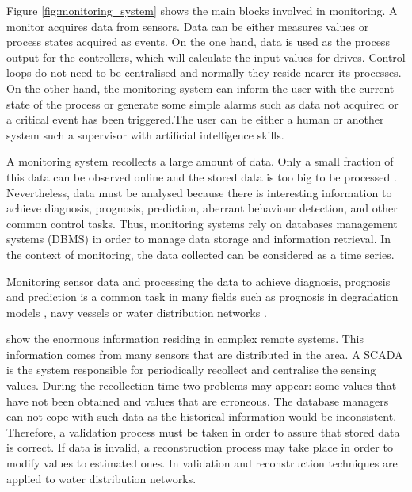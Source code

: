 Figure \ref{fig:monitoring_system} shows the main blocks involved in monitoring. A monitor acquires data from sensors. Data can be either measures values or process states acquired as events. 
On the one hand, data is used as the process output for the controllers, which will calculate the input values for drives. Control loops do not need to be centralised and normally they reside nearer its processes.
On the other hand, the monitoring system can inform the user with the current state of the process or generate some simple alarms such as data not acquired or a critical event has been triggered.The user can be either a human or another system such a supervisor with artificial intelligence skills.

A monitoring system recollects a large amount of data. Only a small
fraction of this data can be observed online and the stored data is
too big to be processed \parencite{keogh97}. Nevertheless, data must be
analysed because there is interesting information to achieve diagnosis,
prognosis, prediction, aberrant behaviour detection, and other common
control tasks. Thus, monitoring systems rely on databases management systems
(DBMS) in order to manage data storage and information retrieval. In the context of monitoring, the data collected can be considered as a time
series.


Monitoring sensor data and processing the data to achieve diagnosis,
prognosis and prediction is a common task in many fields such as
prognosis in degradation models \parencite{yu11}, navy
vessels \parencite{palmer07} or water distribution
networks \parencite{quevedo10}. 


\textcite{quevedo10} show the enormous information residing in complex remote systems. This information comes from many sensors that are distributed in the area. A SCADA is the system responsible for periodically recollect and centralise the sensing values. During the recollection time two problems may appear: some values that have not been obtained and values that are erroneous. The database managers can not cope with such data as the historical information would be inconsistent. Therefore, a validation process must be taken in order to assure that stored data is correct. If data is invalid, a reconstruction process may take place in order to modify values to estimated ones. In \cite{quevedo10} validation and reconstruction techniques are applied to water distribution networks. 





 
